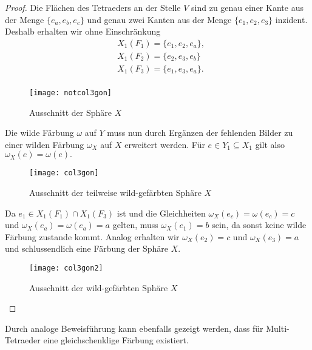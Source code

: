 \documentclass[12pt,titlepage,twoside,cleardoublepage]{article}
\theoremstyle{nummermitklammern}
\numberwithin{equation}{section}
\begin{document}
\begin{proof}
Die Flächen des Tetraeders an der Stelle $V$ sind zu genau einer Kante aus der Menge $\{e_a,e_b,e_c\}$ und genau zwei Kanten aus der Menge $\{e_1,e_2,e_3\}$ inzident. Deshalb erhalten wir ohne Einschränkung 
\begin{align*}
&X_1(F_1)=\{e_1,e_2,e_a\},\\
&X_1(F_2)=\{e_2,e_3,e_b\}\\
& X_1(F_3)=\{e_1,e_3,e_a\}.\\
\end{align*}
\begin{figure}[H]
\begin{center}
\texttt{[image: notcol3gon]}
\end{center}
\caption{Ausschnitt der Sphäre $X$}
\end{figure}
Die wilde Färbung $\omega$ auf $Y$ muss nun durch Ergänzen der fehlenden Bilder zu einer wilden Färbung $\omega_X$ auf $X$ erweitert werden. Für $e\in Y_1\subseteq X_1$ gilt also $\omega_X(e)=\omega(e).$  
\begin{figure}[H]
\begin{center}
\texttt{[image: col3gon]}
\end{center}
\caption{Ausschnitt der teilweise wild-gefärbten Sphäre $X$}
\end{figure}
Da $e_1 \in X_1(F_1)\cap X_1(F_3)$ ist und die Gleichheiten $\omega_X(e_c)=\omega(e_c)=c$ und $\omega_X(e_a)=\omega(e_a)=a$ gelten, muss $\omega_X(e_1)=b$ sein, da sonst keine wilde Färbung zustande kommt. Analog erhalten wir $\omega_X(e_2)=c$ und $\omega_X(e_3)=a$ und schlussendlich eine Färbung der Sphäre $X$.
\begin{figure}[H]
\begin{center}
\texttt{[image: col3gon2]}
\end{center}
\caption{Ausschnitt der wild-gefärbten Sphäre $X$}
\end{figure}
\end{proof}
Durch analoge Beweisführung kann ebenfalls gezeigt werden, dass für Multi-Tetraeder eine gleichschenklige Färbung existiert. 
\end{document}
